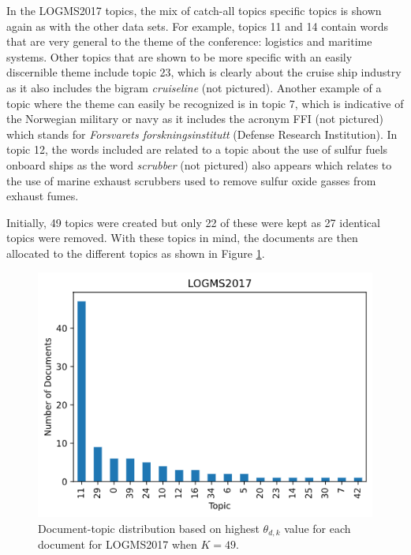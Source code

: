 \documentclass[a4paper, 12pt, twoside]{article}
\numberwithin{equation}{section} %
\begin{document}
In the LOGMS2017 topics, the mix of catch-all topics specific topics is shown again as with the other data sets. For example, topics 11 and 14 contain words that are very general to the theme of the conference: logistics and maritime systems. Other topics that are shown to be more specific with an easily discernible theme include topic 23, which is clearly about the cruise ship industry as it also includes the bigram \textit{cruise\textunderscore line} (not pictured). Another example of a topic where the theme can easily be recognized is in topic 7, which is indicative of the Norwegian military or navy as it includes the acronym FFI (not pictured) which stands for \textit{Forsvarets forskningsinstitutt} (Defense Research Institution). In topic 12, the words included are related to a topic about the use of sulfur fuels onboard ships as the word \textit{scrubber} (not pictured) also appears which relates to the use of marine exhaust scrubbers used to remove sulfur oxide gasses from exhaust fumes. 

Initially, 49 topics were created but only 22 of these were kept as 27 identical topics were removed.  With these topics in mind, the documents are then allocated to the different topics as shown in Figure \ref{fig:LOGMS2017 varied K placements}.


\begin{figure}[H]

  \centering
  \includegraphics[width=0.65\linewidth]{LOGMS_placement.png}
\caption[LOGMS2017 varied K document-topic distribution]{Document-topic distribution based on highest $\theta_{d,k}$ value for each document for LOGMS2017 when $K=49$.}
\label{fig:LOGMS2017 varied K placements}
\end{figure}
\end{document}
